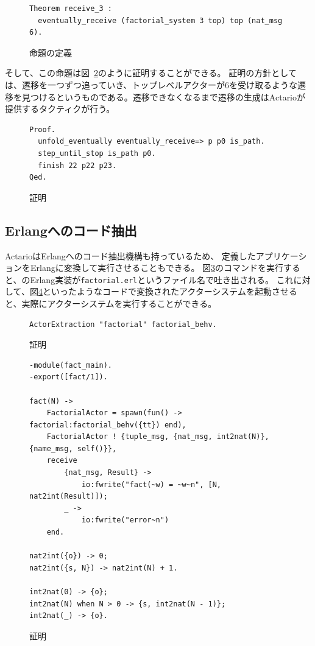 \begin{figure}[tp]
\begin{lstlisting}
Theorem receive_3 :
  eventually_receive (factorial_system 3 top) top (nat_msg 6).
\end{lstlisting}
\label{code:overview:fact-spec}
\caption{命題の定義}
\end{figure}

そして、この命題は図~\ref{code:overview:fact-proof}のように証明することができる。
証明の方針としては、遷移を一つずつ追っていき、トップレベルアクターが$6$を受け取るような遷移を見つけるというものである。遷移できなくなるまで遷移の生成はActarioが提供するタクティクが行う。

\begin{figure}[tp]
\begin{lstlisting}
Proof.
  unfold_eventually eventually_receive=> p p0 is_path.
  step_until_stop is_path p0.
  finish 22 p22 p23.
Qed.
\end{lstlisting}
  \label{code:overview:fact-proof}
  \caption{証明}
\end{figure}


\subsection{Erlangへのコード抽出}

ActarioはErlangへのコード抽出機構も持っているため、
定義したアプリケーションをErlangに変換して実行させることもできる。
図\ref{code:overview:extraction}のコマンドを実行すると、のErlang実装が\texttt{factorial.erl}というファイル名で吐き出される。
これに対して、図\ref{code:overview:run}といったようなコードで変換されたアクターシステムを起動させると、実際にアクターシステムを実行することができる。

\begin{figure}[tp]
\begin{lstlisting}
ActorExtraction "factorial" factorial_behv.
\end{lstlisting}
\label{code:overview:extraction}
\caption{証明}
\end{figure}

\begin{figure}
\begin{lstlisting}
-module(fact_main).
-export([fact/1]).

fact(N) ->
    FactorialActor = spawn(fun() -> factorial:factorial_behv({tt}) end),
    FactorialActor ! {tuple_msg, {nat_msg, int2nat(N)}, {name_msg, self()}},
    receive
        {nat_msg, Result} ->
            io:fwrite("fact(~w) = ~w~n", [N, nat2int(Result)]);
        _ ->
            io:fwrite("error~n")
    end.

nat2int({o}) -> 0;
nat2int({s, N}) -> nat2int(N) + 1.

int2nat(0) -> {o};
int2nat(N) when N > 0 -> {s, int2nat(N - 1)};
int2nat(_) -> {o}.
\end{lstlisting}
\label{code:overview:run}
\caption{証明}
\end{figure}
